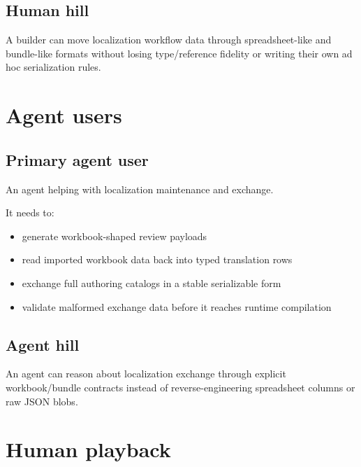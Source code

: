 \subsection{Human hill}\label{record-190-human-hill}

A builder can move localization workflow data through spreadsheet-like and bundle-like formats without losing type/reference fidelity or writing their own ad hoc serialization rules.

\section{Agent users}\label{record-190-agent-users}

\subsection{Primary agent user}\label{record-190-primary-agent-user}

An agent helping with localization maintenance and exchange.

It needs to:

\begin{itemize}
\tightlist
\item
  generate workbook-shaped review payloads
\item
  read imported workbook data back into typed translation rows
\item
  exchange full authoring catalogs in a stable serializable form
\item
  validate malformed exchange data before it reaches runtime compilation
\end{itemize}

\subsection{Agent hill}\label{record-190-agent-hill}

An agent can reason about localization exchange through explicit workbook/bundle contracts instead of reverse-engineering spreadsheet columns or raw JSON blobs.

\section{Human playback}\label{record-190-human-playback}

